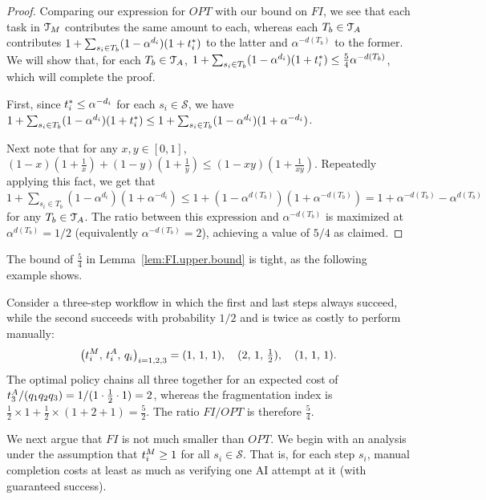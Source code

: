 \begin{proof}
Comparing our expression for $OPT$ with our bound on $FI$, we see that each task in $\mathcal{T}_{M}$ contributes the same amount to each, whereas each $T_b \in \mathcal{T}_{A}$ contributes $1+\sum_{s_i \in T_b}(1-\alpha^{d_i})(1+t^*_{i})$ to the latter and $\alpha^{-d(T_b)}$ to the former.
We will show that, for each $T_b \in \mathcal{T}_{A}$, $1 + \sum_{s_i \in T_b}(1-\alpha^{d_i})(1+t^*_{i}) \leq \frac{5}{4} \alpha^{-d(T_b)}$, which will complete the proof.

First, since $t^*_{i} \leq \alpha^{-d_i}$ for each $s_i \in \mathcal{S}$, we have $1 + \sum_{s_i \in T_b}(1-\alpha^{d_i})(1+t^*_{i}) \leq 1 + \sum_{s_i \in T_b}(1-\alpha^{d_i})(1+\alpha^{-d_i})$.

Next note that for any $x,y\in [0,1]$, $(1-x)(1+\tfrac{1}{x}) + (1-y)(1+\tfrac{1}{y}) \leq (1-xy)(1+\tfrac{1}{xy}) $.
Repeatedly applying this fact, we get that $1 + \sum_{s_i \in T_b}(1-\alpha^{d_i})(1+\alpha^{-d_i}) \leq 1 + (1-\alpha^{d(T_b)})(1+\alpha^{-d(T_b)}) = 1 + \alpha^{-d(T_b)} - \alpha^{d(T_b)}$ for any $T_b \in \mathcal{T}_{A}$.
The ratio between this expression and $\alpha^{-d(T_b)}$ is maximized at $\alpha^{d(T_b)} = 1/2$ (equivalently $\alpha^{-d(T_b)} = 2$), achieving a value of $5/4$ as claimed.
\end{proof}

The bound of $\tfrac{5}{4}$ in Lemma~\ref{lem:FI.upper.bound} is tight, as the following example shows.

\begin{example}
\label{ex:FI.tight}
Consider a three-step workflow in which the first and last steps always succeed, while the second succeeds with probability $1/2$ and is twice as costly to perform manually:
\[ \bigl(t^{M}_{i},\, t^{A}_{i},\, q_i\bigr)_{i=1,2,3} = (1,\,1,\,1),\quad (2,\,1,\,\tfrac12),\quad (1,\,1,\,1). \]
The optimal policy chains all three together for an expected cost of $t^{A}_{3}/(q_1 q_2 q_3) = 1/(1 \cdot \tfrac12 \cdot 1) = 2$, whereas the fragmentation index is $\tfrac12 \times 1 + \tfrac12 \times (1+2+1) = \tfrac52$.
The ratio $FI/OPT$ is therefore $\tfrac54$.
\end{example}

We next argue that $FI$ is not much smaller than $OPT$.
We begin with an analysis under the assumption that $t^{M}_{i} \geq 1$ for all $s_i \in \mathcal{S}$.
That is, for each step $s_i$, manual completion costs at least as much as verifying one AI attempt at it (with guaranteed success).

